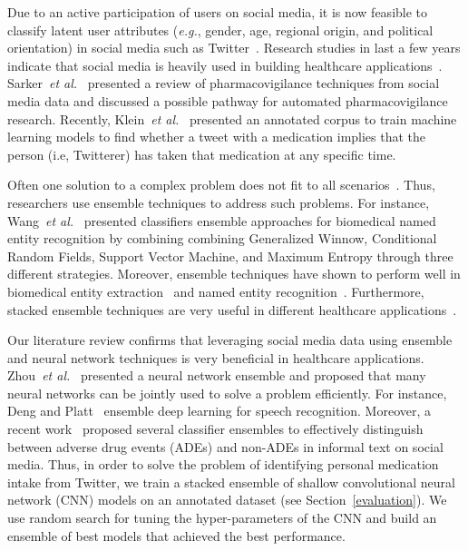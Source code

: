 Due to an active participation of users on social media, it is now feasible
to classify latent user attributes (\emph{e.g.}, gender, age, regional origin,
and political orientation) in social media such as Twitter~\cite{rao2010classifying}.
Research studies in last a few years indicate that social media is heavily used
in building healthcare applications~\cite{grajales2014social, toxicovigilance, rosenthal2017semeval}.
Sarker~\emph{et al.}~\cite{sarker2015utilizing} presented a review of pharmacovigilance techniques from
social media data and discussed a possible pathway for automated pharmacovigilance research.
Recently, Klein~\emph{et al.}~\cite{klein2017detecting} presented an annotated corpus
to train machine learning models to find whether a tweet with a medication implies
that the person (i.e, Twitterer) has taken that medication at any specific time.

Often one solution to a complex problem does not fit to all scenarios~\cite{bell2010all}.
Thus, researchers use ensemble techniques to address such problems. For instance, 
Wang~\emph{et al.}~\cite{wang2008biomedical} presented classifiers ensemble approaches 
for biomedical named entity recognition by combining combining Generalized Winnow, 
Conditional Random Fields, Support Vector Machine, and Maximum Entropy through three 
different strategies. Moreover, ensemble techniques have shown to perform well in 
biomedical entity extraction~\cite{ekbal2013stacked} and named entity 
recognition~\cite{sikdar2012differential, speck2014ensemble}. Furthermore, 
stacked ensemble techniques are very useful in different healthcare 
applications~\cite{dinakar2014stacked, speck2014ensemble}.

Our literature review confirms that leveraging social media data using ensemble and 
neural network techniques is very beneficial in healthcare applications. 
Zhou~\emph{et al.}~\cite{zhou2002ensembling} presented a neural network ensemble and 
proposed that many neural networks can be jointly used to solve a problem efficiently. 
For instance, Deng and Platt~\cite{deng2014ensemble} ensemble deep learning for speech 
recognition. Moreover, a recent work~\cite{liu2016ensemble} proposed several classifier 
ensembles to effectively distinguish between adverse drug events (ADEs) and non-ADEs in 
informal text on social media. Thus, in order to solve the problem of identifying personal 
medication intake from Twitter, we train a stacked ensemble of shallow convolutional neural 
network (CNN) models on an annotated dataset (see Section~\ref{evaluation}). We use random 
search for tuning the hyper-parameters of the CNN and build an ensemble of best models that 
achieved the best performance. 



